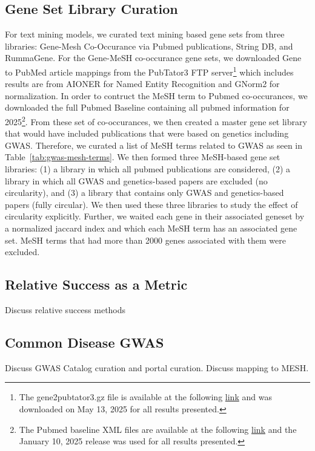 \documentclass[sn-nature,lineno]{sn-jnl}%
\theoremstyle{thmstyleone}%
\theoremstyle{thmstyletwo}%
\theoremstyle{thmstylethree}%
\begin{document}
\subsection{Gene Set Library Curation}
For text mining models, we curated text mining based gene sets from three libraries: Gene-Mesh Co-Occurance via Pubmed publications, String DB, and RummaGene. For the Gene-MeSH co-occurance gene sets, we downloaded Gene to PubMed article mappings from the PubTator3 \cite{wei_pubtator_2024} FTP server\footnote{The gene2pubtator3.gz file is available at the following \href{https://ftp.ncbi.nlm.nih.gov/pub/lu/PubTator3/}{link} and was downloaded on May 13, 2025 for all results presented.} which includes results are from AIONER \cite{luo_aioner_2023} for Named Entity Recognition and GNorm2 \cite{wei_gnorm2_2023} for normalization. In order to contruct the MeSH term to Pubmed co-occurances, we downloaded the full Pubmed Baseline containing all pubmed information for 2025\footnote{The Pubmed baseline XML files are available at the following \href{https://ftp.ncbi.nlm.nih.gov/pubmed/baseline/}{link} and the January 10, 2025 release was used for all results presented.}. From these set of co-occurances, we then created a master gene set library that would have included publications that were based on genetics including GWAS. Therefore, we curated a list of MeSH terms related to GWAS as seen in Table~\ref{tab:gwas-mesh-terms}. We then formed three MeSH-based gene set libraries: (1) a library in which all pubmed publications are considered, (2) a library in which all GWAS and genetics-based papers are excluded (no circularity), and (3) a library that contains only GWAS and genetics-based papers (fully circular). We then used these three libraries to study the effect of circularity explicitly. Further, we waited each gene in their associated geneset by a normalized jaccard index and which each MeSH term has an associated gene set. MeSH terms that had more than 2000 genes associated with them were excluded.



\subsection{Relative Success as a Metric}
Discuss relative success methods

\subsection{Common Disease GWAS}
Discuss GWAS Catalog curation and portal curation. Discuss mapping to MESH.
\end{document}
